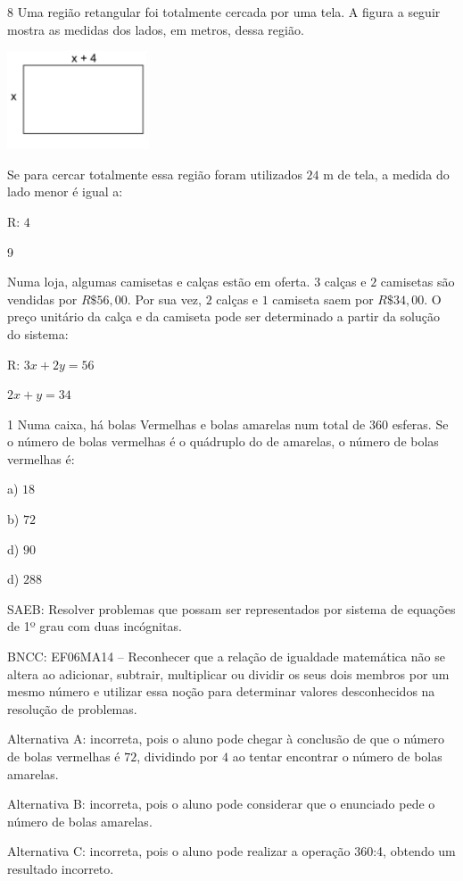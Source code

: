 \num{8}  Uma região retangular foi totalmente cercada por uma tela. A figura a
seguir mostra as medidas dos lados, em metros, dessa região.

\includegraphics[width=1.65625in,height=1.14583in]{./imgSAEB_6_MAT/media/image38.png}

Se para cercar totalmente essa região foram utilizados $24$ m de tela, a
medida do lado menor é igual a:

R: $4$

\num{9} 

Numa loja, algumas camisetas e calças estão em oferta. $3$ calças e $2$
camisetas são vendidas por $R\$56,00$. Por sua vez, $2$ calças e $1$ camiseta
saem por $R\$34,00$. O preço unitário da calça e da camiseta pode ser
determinado a partir da solução do sistema:

R: $3x + 2y = 56$

$2x + y = 34$


\num{1}  Numa caixa, há bolas Vermelhas e bolas amarelas num total de $360$
esferas. Se o número de bolas vermelhas é o quádruplo do de amarelas, o
número de bolas vermelhas é:

a) $18$

b) $72$

d) $90$

d) $288$

SAEB: Resolver problemas que possam ser representados por sistema de
equações de 1º grau com duas incógnitas.

BNCC: EF06MA14 -- Reconhecer que a relação de igualdade matemática não
se altera ao adicionar, subtrair, multiplicar ou dividir os seus dois
membros por um mesmo número e utilizar essa noção para determinar
valores desconhecidos na resolução de problemas.

Alternativa A: incorreta, pois o aluno pode chegar à conclusão de que o
número de bolas vermelhas é $72$, dividindo por $4$ ao tentar encontrar o
número de bolas amarelas.

Alternativa B: incorreta, pois o aluno pode considerar que o enunciado
pede o número de bolas amarelas.

Alternativa C: incorreta, pois o aluno pode realizar a operação $360$:4,
obtendo um resultado incorreto.

